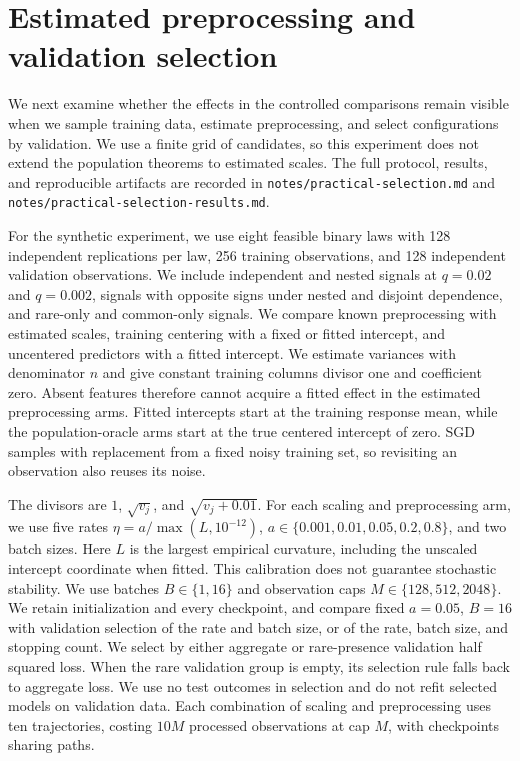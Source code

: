 \section{Estimated preprocessing and validation selection}
\label{sec:practical}

We next examine whether the effects in the controlled comparisons remain visible
when we sample training data, estimate preprocessing, and select configurations
by validation. We use a finite grid of candidates, so this experiment does not
extend the population theorems to estimated scales. The full protocol, results,
and reproducible artifacts are recorded in \texttt{notes/practical-selection.md}
and \texttt{notes/practical-selection-results.md}.

For the synthetic experiment, we use eight feasible binary laws with 128
independent replications per law, 256 training observations, and 128 independent
validation observations. We include independent and nested signals at $q = 0.02$
and $q = 0.002$, signals with opposite signs under nested and disjoint
dependence, and rare-only and common-only signals. We compare known
preprocessing with estimated scales, training centering with a fixed or fitted
intercept, and uncentered predictors with a fitted intercept. We estimate
variances with denominator $n$ and give constant training columns divisor one
and coefficient zero. Absent features therefore cannot acquire a fitted effect
in the estimated preprocessing arms. Fitted intercepts start at the training
response mean, while the population-oracle arms start at the true centered
intercept of zero. SGD samples with replacement from a fixed noisy training
set, so revisiting an observation also reuses its noise.

The divisors are $1$, $\sqrt{v_j}$, and $\sqrt{v_j + 0.01}$. For each scaling
and preprocessing arm, we use five rates $\eta = a/\max(L,10^{-12})$,
$a \in \{0.001,0.01,0.05,0.2,0.8\}$, and two batch sizes. Here $L$ is the
largest empirical curvature, including the unscaled intercept coordinate when
fitted. This calibration does not guarantee stochastic stability. We use batches
$B \in \{1,16\}$ and observation caps $M \in \{128,512,2048\}$. We retain
initialization and every checkpoint, and compare fixed $a = 0.05$, $B = 16$ with
validation selection of the rate and batch size, or of the rate, batch size,
and stopping count. We select by either aggregate or rare-presence validation
half squared loss. When the rare validation group is empty, its selection rule
falls back to aggregate loss. We use no test outcomes in selection and do not
refit selected models on validation data. Each combination of scaling and
preprocessing uses ten trajectories, costing $10M$ processed observations at
cap $M$, with checkpoints sharing paths.

